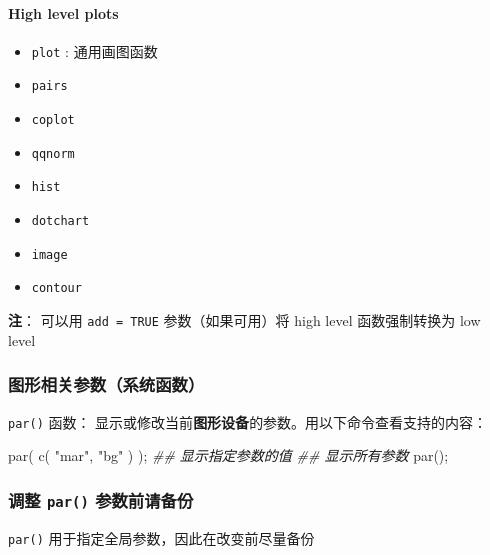 \documentclass[
]{article}
\newenvironment{Shaded}{}{}
\newcommand{\DocumentationTok}[1]{\textcolor[rgb]{0.73,0.13,0.13}{\textit{#1}}}
\newcommand{\FunctionTok}[1]{\textcolor[rgb]{0.02,0.16,0.49}{#1}}
\newcommand{\NormalTok}[1]{#1}
\newcommand{\StringTok}[1]{\textcolor[rgb]{0.25,0.44,0.63}{#1}}
\begin{document}
\hypertarget{high-level-plots}{%
\paragraph{High level plots}\label{high-level-plots}}

\begin{itemize}
\item
  \texttt{plot} : 通用画图函数
\item
  \texttt{pairs}
\item
  \texttt{coplot}
\item
  \texttt{qqnorm}
\item
  \texttt{hist}
\item
  \texttt{dotchart}
\item
  \texttt{image}
\item
  \texttt{contour}
\end{itemize}

\textbf{注}： 可以用 \texttt{add\ =\ TRUE} 参数（如果可用）将 high level
函数强制转换为 low level

\hypertarget{ux56feux5f62ux76f8ux5173ux53c2ux6570ux7cfbux7edfux51fdux6570uxff09}{%
\subsubsection{图形相关参数（系统函数）}\label{ux56feux5f62ux76f8ux5173ux53c2ux6570ux7cfbux7edfux51fdux6570uxff09}}

\texttt{par()} 函数：
显示或修改当前\textbf{图形设备}的参数。用以下命令查看支持的内容：

\begin{Shaded}
\begin{Highlighting}[]
\FunctionTok{par}\NormalTok{( }\FunctionTok{c}\NormalTok{( }\StringTok{"mar"}\NormalTok{, }\StringTok{"bg"}\NormalTok{ ) ); }\DocumentationTok{\#\# 显示指定参数的值}
\DocumentationTok{\#\# 显示所有参数 }
\FunctionTok{par}\NormalTok{(); }
\end{Highlighting}
\end{Shaded}

\hypertarget{ux8c03ux6574-par-ux53c2ux6570ux524dux8bf7ux5907ux4efd}{%
\subsubsection{\texorpdfstring{调整 \texttt{par()}
参数前请备份}{调整 par() 参数前请备份}}\label{ux8c03ux6574-par-ux53c2ux6570ux524dux8bf7ux5907ux4efd}}

\texttt{par()} 用于指定全局参数，因此在改变前尽量备份
\end{document}
